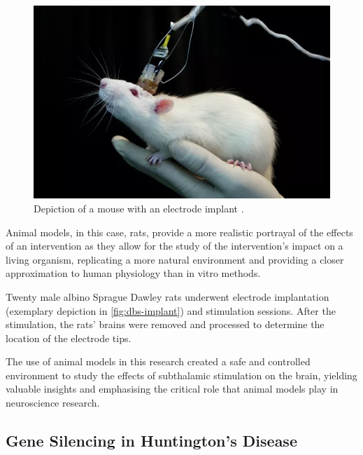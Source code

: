 \documentclass[10pt]{article}
\begin{document}
\begin{sloppypar}
  \vspace{10pt} %
  \begin{figure}[ht]
    \centering
    \includegraphics[width=\textwidth]{figures/scientist-deep-brain-stimulation.png}
    \caption[Depiction of a mouse with an electrode implant]{Depiction of a mouse with an electrode implant \citep{sharma_scientists_2017}.}
    \label{fig:dbs-implant}
  \end{figure}

  Animal models, in this case, rats, provide a more realistic portrayal of the effects of an intervention as they allow for the study of the intervention’s impact on a living organism, replicating a more natural environment and providing a closer approximation to human physiology than in vitro methods.

  Twenty male albino Sprague Dawley rats underwent electrode implantation (exemplary depiction in \autoref{fig:dbs-implant}) and stimulation sessions. After the stimulation, the rats’ brains were removed and processed to determine the location of the electrode tips.

  The use of animal models in this research created a safe and controlled environment to study the effects of subthalamic stimulation on the brain, yielding valuable insights and emphasising the critical role that animal models play in neuroscience research.

  \subsection{Gene Silencing in Huntington’s Disease}
  \label{sec:huntingtons}


\end{sloppypar}
\end{document}
